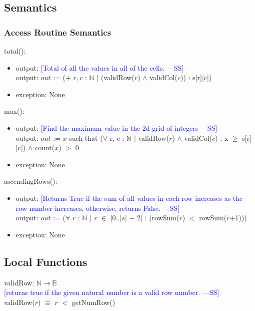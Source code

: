 \documentclass[12pt]{article}
\newcommand{\authornote}[3]{\textcolor{#1}{[#3 ---#2]}}
\newcommand{\authornote}[3]{}
\newcommand{\wss}[1]{\authornote{blue}{SS}{#1}}
\begin{document}
\subsection* {Semantics}

\subsubsection* {Access Routine Semantics}

\noindent total():
\begin{itemize}
\item output: \wss{Total of all the values in all of the cells.}\\
output: $out$ := (+ $r, c$ : $\mathbb{N}$ $|$ (validRow($r$) $\land$ validCol($c$)) : s[r][c])
\item exception: None
\end{itemize}

\noindent max():
\begin{itemize}
\item output: \wss{Find the maximum value in the 2d grid of integers}\\
output: $out$ := $x$ such that ($\forall$ r, c : $\mathbb{N}$ $|$ validRow($r$) $\land$ validCol($c$) : x $\ge$ s[r][c]) $\land$ count($x$) $>$ 0
\item exception: None
\end{itemize}

\noindent ascendingRows():
\begin{itemize}
\item output: \wss{Returns True if the sum of all values in each row increases
    as the row number increases, otherwise, returns False.}\\
    output: $out$ := ($\forall$ $r$ : $\mathbb{N}$ $|$ $r$ $\in$ [0..$|$$s|$ $-$ 2] : (rowSum($r$) $<$ rowSum($r$+1)))
    
\item exception: None
\end{itemize}

\subsection*{Local Functions}

\noindent validRow: $\mathbb{N} \rightarrow \mathbb{B}$\\
\noindent \wss{returns true if the given natural number is a valid row
  number.}\\
    validRow($r$) $\equiv$ $r$ $<$ getNumRow()
    \medskip
\end{document}
